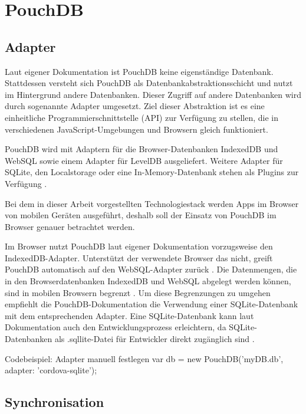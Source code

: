 \section{PouchDB}
\label{PouchDB}

\subsection{Adapter}
\label{Adapter}

Laut eigener Dokumentation ist PouchDB keine eigenständige Datenbank. Stattdessen versteht sich PouchDB als Datenbankabstraktionsschicht und nutzt im Hintergrund andere Datenbanken. Dieser Zugriff auf andere Datenbanken wird durch sogenannte Adapter umgesetzt. Ziel dieser Abstraktion ist es eine einheitliche Programmierschnittstelle (API) zur Verfügung zu stellen, die in verschiedenen JavaScript-Umgebungen und Browsern gleich funktioniert.

PouchDB wird mit Adaptern für die Browser-Datenbanken IndexedDB und WebSQL sowie einem Adapter für LevelDB ausgeliefert. Weitere Adapter für SQLite, den Localstorage oder eine In-Memory-Datenbank stehen als Plugins zur Verfügung \cite{pouch:adapters}.


Bei dem in dieser Arbeit vorgestellten Technologiestack werden Apps im Browser von mobilen Geräten ausgeführt, deshalb soll der Einsatz von PouchDB im Browser genauer betrachtet werden.

Im Browser nutzt PouchDB laut eigener Dokumentation vorzugsweise den IndexedDB-Adapter. Unterstützt der verwendete Browser das nicht, greift PouchDB automatisch auf den WebSQL-Adapter zurück \cite{pouch:adapters}. Die Datenmengen, die in den Browserdatenbanken IndexedDB und WebSQL abgelegt werden können, sind in mobilen Browsern begrenzt \cite{html5:quota}. Um diese Begrenzungen zu umgehen empfiehlt die PouchDB-Dokumentation die Verwendung einer SQLite-Datenbank mit dem entsprechenden Adapter. Eine SQLite-Datenbank kann laut Dokumentation auch den Entwicklungsprozess erleichtern, da SQLite-Datenbanken als .sqllite-Datei für Entwickler direkt zugänglich sind  \cite{pouch:adapters}.


Codebeispiel: Adapter manuell festlegen
var db = new PouchDB('myDB.db', {adapter: 'cordova-sqlite'});


\subsection{Synchronisation}
\label{Synchronisation}

